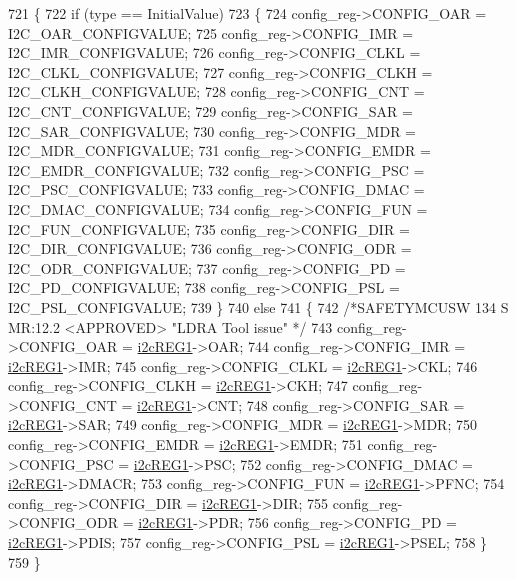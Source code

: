 \begin{DoxyCode}
721 \{
722     \textcolor{keywordflow}{if} (type == InitialValue)
723     \{
724         config\_reg->CONFIG\_OAR  = I2C\_OAR\_CONFIGVALUE;
725         config\_reg->CONFIG\_IMR  = I2C\_IMR\_CONFIGVALUE;
726         config\_reg->CONFIG\_CLKL = I2C\_CLKL\_CONFIGVALUE;
727         config\_reg->CONFIG\_CLKH = I2C\_CLKH\_CONFIGVALUE;
728         config\_reg->CONFIG\_CNT  = I2C\_CNT\_CONFIGVALUE;
729         config\_reg->CONFIG\_SAR  = I2C\_SAR\_CONFIGVALUE;
730         config\_reg->CONFIG\_MDR  = I2C\_MDR\_CONFIGVALUE;
731         config\_reg->CONFIG\_EMDR = I2C\_EMDR\_CONFIGVALUE;
732         config\_reg->CONFIG\_PSC  = I2C\_PSC\_CONFIGVALUE;
733         config\_reg->CONFIG\_DMAC = I2C\_DMAC\_CONFIGVALUE;
734         config\_reg->CONFIG\_FUN  = I2C\_FUN\_CONFIGVALUE;
735         config\_reg->CONFIG\_DIR  = I2C\_DIR\_CONFIGVALUE;
736         config\_reg->CONFIG\_ODR  = I2C\_ODR\_CONFIGVALUE;
737         config\_reg->CONFIG\_PD   = I2C\_PD\_CONFIGVALUE;
738         config\_reg->CONFIG\_PSL  = I2C\_PSL\_CONFIGVALUE;
739     \}
740     \textcolor{keywordflow}{else}
741     \{
742     \textcolor{comment}{/*SAFETYMCUSW 134 S MR:12.2 <APPROVED> "LDRA Tool issue" */}
743         config\_reg->CONFIG\_OAR  = \mbox{\hyperlink{reg__i2c_8h_a54937525fe89322407ede2bc3a5d0e4c}{i2cREG1}}->OAR;
744         config\_reg->CONFIG\_IMR  = \mbox{\hyperlink{reg__i2c_8h_a54937525fe89322407ede2bc3a5d0e4c}{i2cREG1}}->IMR;
745         config\_reg->CONFIG\_CLKL = \mbox{\hyperlink{reg__i2c_8h_a54937525fe89322407ede2bc3a5d0e4c}{i2cREG1}}->CKL;
746         config\_reg->CONFIG\_CLKH = \mbox{\hyperlink{reg__i2c_8h_a54937525fe89322407ede2bc3a5d0e4c}{i2cREG1}}->CKH;
747         config\_reg->CONFIG\_CNT  = \mbox{\hyperlink{reg__i2c_8h_a54937525fe89322407ede2bc3a5d0e4c}{i2cREG1}}->CNT;
748         config\_reg->CONFIG\_SAR  = \mbox{\hyperlink{reg__i2c_8h_a54937525fe89322407ede2bc3a5d0e4c}{i2cREG1}}->SAR;
749         config\_reg->CONFIG\_MDR  = \mbox{\hyperlink{reg__i2c_8h_a54937525fe89322407ede2bc3a5d0e4c}{i2cREG1}}->MDR;
750         config\_reg->CONFIG\_EMDR = \mbox{\hyperlink{reg__i2c_8h_a54937525fe89322407ede2bc3a5d0e4c}{i2cREG1}}->EMDR;
751         config\_reg->CONFIG\_PSC  = \mbox{\hyperlink{reg__i2c_8h_a54937525fe89322407ede2bc3a5d0e4c}{i2cREG1}}->PSC;
752         config\_reg->CONFIG\_DMAC = \mbox{\hyperlink{reg__i2c_8h_a54937525fe89322407ede2bc3a5d0e4c}{i2cREG1}}->DMACR;
753         config\_reg->CONFIG\_FUN  = \mbox{\hyperlink{reg__i2c_8h_a54937525fe89322407ede2bc3a5d0e4c}{i2cREG1}}->PFNC;
754         config\_reg->CONFIG\_DIR  = \mbox{\hyperlink{reg__i2c_8h_a54937525fe89322407ede2bc3a5d0e4c}{i2cREG1}}->DIR;
755         config\_reg->CONFIG\_ODR  = \mbox{\hyperlink{reg__i2c_8h_a54937525fe89322407ede2bc3a5d0e4c}{i2cREG1}}->PDR;
756         config\_reg->CONFIG\_PD   = \mbox{\hyperlink{reg__i2c_8h_a54937525fe89322407ede2bc3a5d0e4c}{i2cREG1}}->PDIS;
757         config\_reg->CONFIG\_PSL  = \mbox{\hyperlink{reg__i2c_8h_a54937525fe89322407ede2bc3a5d0e4c}{i2cREG1}}->PSEL;
758     \}
759 \}
\end{DoxyCode}
\mbox{\label{group__I2C_ga1e0a81a1ad1fd7710ca189236e3e5476}} 
